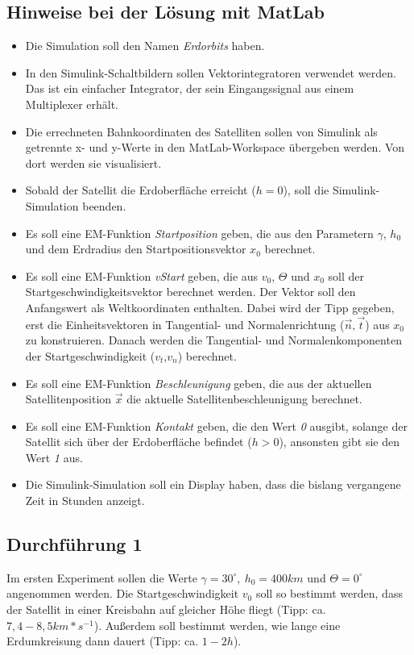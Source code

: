 \documentclass[]{scrartcl}
\begin{document}
\subsection{Hinweise bei der Lösung mit MatLab}
\begin{itemize}
\item Die Simulation soll den Namen \textit{Erdorbits} haben.
\item In den Simulink-Schaltbildern sollen Vektorintegratoren verwendet werden. Das ist ein einfacher Integrator, der sein Eingangssignal aus einem Multiplexer erhält.
\item Die errechneten Bahnkoordinaten des Satelliten sollen von Simulink als getrennte x- und y-Werte in den MatLab-Workspace übergeben werden. Von dort werden sie visualisiert.
\item Sobald der Satellit die Erdoberfläche erreicht ($h=0$), soll die Simulink-Simulation beenden.
\item Es soll eine EM-Funktion \textit{Startposition} geben, die aus den Parametern $\gamma$, $h_{0}$ und dem Erdradius den Startpositionsvektor $x_{0}$ berechnet.
\item Es soll eine EM-Funktion \textit{vStart} geben, die aus $v_{0}$, $\Theta$ und $x_{0}$ soll der Startgeschwindigkeitsvektor berechnet werden. Der Vektor soll den Anfangswert als Weltkoordinaten enthalten. Dabei wird der Tipp gegeben, erst die Einheitsvektoren in Tangential- und Normalenrichtung ($\vec{n},\vec{t}$) aus $x_{0}$ zu konstruieren. Danach werden die Tangential- und Normalenkomponenten der Startgeschwindigkeit ($v_{t}$,$v_{n}$) berechnet. %
\item Es soll eine EM-Funktion \textit{Beschleunigung} geben, die aus der aktuellen Satellitenposition $\vec{x}$ die aktuelle Satellitenbeschleunigung berechnet.
\item Es soll eine EM-Funktion \textit{Kontakt} geben, die den Wert \textit{0} ausgibt, solange der Satellit sich über der Erdoberfläche befindet ($h > 0$), ansonsten gibt sie den Wert \textit{1} aus.
\item Die Simulink-Simulation soll ein Display haben, dass die bislang vergangene Zeit in Stunden anzeigt.
\end{itemize}

\subsection{Durchführung 1}
Im ersten Experiment sollen die Werte $\gamma = 30^\circ,\ h_{0} = 400km$ und $\Theta=0^\circ$ angenommen werden. Die Startgeschwindigkeit $v_{0}$ soll so bestimmt werden, dass der Satellit in einer Kreisbahn auf gleicher Höhe fliegt (Tipp: ca. $7,4 - 8,5 km*s^{-1}$). Außerdem soll bestimmt werden, wie lange eine Erdumkreisung dann dauert (Tipp: ca. $1 - 2h$).
\end{document}
